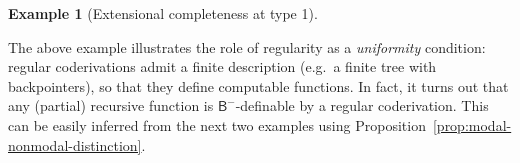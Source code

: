 \documentclass[manuscript,screen]{acmart}
\newcommand{\blue}[1]{{\color{blue}#1}}
\theoremstyle{definition}
\newtheorem{exmp}[thm]{Example}
\theoremstyle{remark}
\newcommand{\Nat}{\mathbb{N}}
\newcommand{\n}{N}
\newcommand{\sq}{\Box}
\newcommand{\sqn}{{\sq\n}}
\newcommand{\sn}{\sqn}
\renewcommand{\succ}[1]{\mathsf{s}_{#1}}
\newcommand{\cnd}{\mathsf{cond}}
\newcommand{\bc}{\mathsf{B}}
\newcommand{\bcnorec}{\bc^{-}}
\newcommand{\seqar}{\Rightarrow}
\newcommand{\id}{\mathsf{id}}
\newcommand{\wk}{\mathsf{w}}
\newcommand{\cut}{\mathsf{cut}}
\newcommand{\zero}{0}
\begin{document}
\begin{exmp}[Extensional completeness at type 1]
\end{exmp}

The above example illustrates the role of regularity as a \emph{uniformity} condition:  regular coderivations admit a finite description  (e.g.~a finite tree with backpointers), so that they define  computable functions. In fact, it turns out that any (partial) recursive function  is $\bcnorec$-definable by a regular coderivation. This can be easily inferred from  the next two examples using Proposition~\ref{prop:modal-nonmodal-distinction}.
\end{document}
